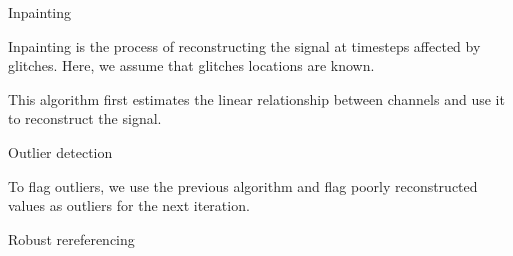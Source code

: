 \documentclass[10pt,serif]{beamer}
\begin{document}
\begin{frame}{Inpainting}

  Inpainting is the process of reconstructing the signal at timesteps affected by glitches. Here, we assume that glitches locations are known.

  This algorithm first estimates the linear relationship between channels and use it to reconstruct the signal.


\end{frame}

\begin{frame}{Outlier detection}

  To flag outliers, we use the previous algorithm and flag poorly reconstructed values as outliers for the next iteration.


\end{frame}

\begin{frame}{Robust rereferencing}


\end{frame}
\end{document}
